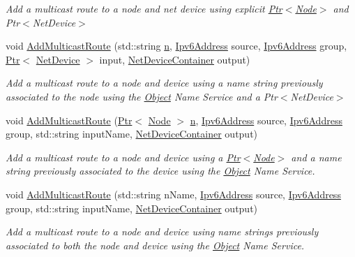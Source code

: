 \begin{DoxyCompactItemize}
\begin{DoxyCompactList}\small\item\em Add a multicast route to a node and net device using explicit \hyperlink{classns3_1_1Ptr}{Ptr$<$\+Node$>$} and Ptr$<$\+Net\+Device$>$ \end{DoxyCompactList}\item 
void \hyperlink{classns3_1_1Ipv6StaticRoutingHelper_a5818d6d0d82274eb444b8c0d74d37516}{Add\+Multicast\+Route} (std\+::string \hyperlink{lte__link__budget__x2__handover__measures_8m_abdb05bc5a064cf642a06c83b3392f148}{n}, \hyperlink{classns3_1_1Ipv6Address}{Ipv6\+Address} source, \hyperlink{classns3_1_1Ipv6Address}{Ipv6\+Address} group, \hyperlink{classns3_1_1Ptr}{Ptr}$<$ \hyperlink{classns3_1_1NetDevice}{Net\+Device} $>$ input, \hyperlink{classns3_1_1NetDeviceContainer}{Net\+Device\+Container} output)
\begin{DoxyCompactList}\small\item\em Add a multicast route to a node and device using a name string previously associated to the node using the \hyperlink{classns3_1_1Object}{Object} Name Service and a Ptr$<$\+Net\+Device$>$ \end{DoxyCompactList}\item 
void \hyperlink{classns3_1_1Ipv6StaticRoutingHelper_a0712124ec79872a665e3532d43c1e640}{Add\+Multicast\+Route} (\hyperlink{classns3_1_1Ptr}{Ptr}$<$ \hyperlink{classns3_1_1Node}{Node} $>$ \hyperlink{lte__link__budget__x2__handover__measures_8m_abdb05bc5a064cf642a06c83b3392f148}{n}, \hyperlink{classns3_1_1Ipv6Address}{Ipv6\+Address} source, \hyperlink{classns3_1_1Ipv6Address}{Ipv6\+Address} group, std\+::string input\+Name, \hyperlink{classns3_1_1NetDeviceContainer}{Net\+Device\+Container} output)
\begin{DoxyCompactList}\small\item\em Add a multicast route to a node and device using a \hyperlink{classns3_1_1Ptr}{Ptr$<$\+Node$>$} and a name string previously associated to the device using the \hyperlink{classns3_1_1Object}{Object} Name Service. \end{DoxyCompactList}\item 
void \hyperlink{classns3_1_1Ipv6StaticRoutingHelper_a7d5f7ed76864b25e72dbb79a3faee717}{Add\+Multicast\+Route} (std\+::string n\+Name, \hyperlink{classns3_1_1Ipv6Address}{Ipv6\+Address} source, \hyperlink{classns3_1_1Ipv6Address}{Ipv6\+Address} group, std\+::string input\+Name, \hyperlink{classns3_1_1NetDeviceContainer}{Net\+Device\+Container} output)
\begin{DoxyCompactList}\small\item\em Add a multicast route to a node and device using name strings previously associated to both the node and device using the \hyperlink{classns3_1_1Object}{Object} Name Service. \end{DoxyCompactList}\end{DoxyCompactItemize}
